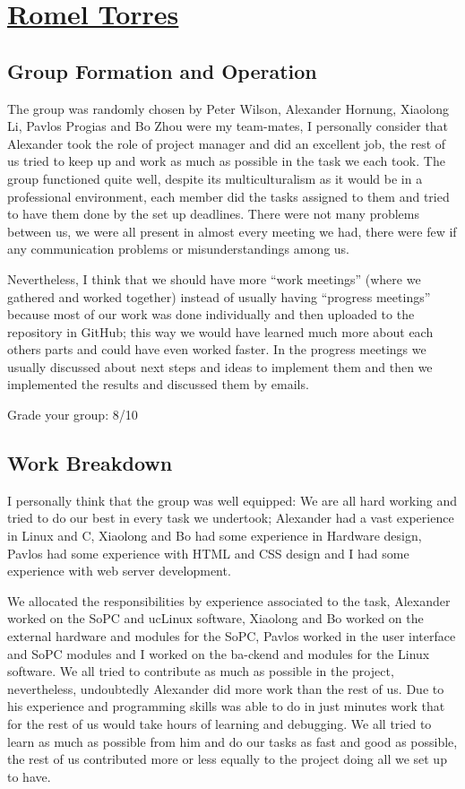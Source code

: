 \section{\texorpdfstring{\href{mailto:rt5g11@ecs.soton.ac.uk}{Romel Torres}} {Romel Torres}}

\subsection{Group Formation and Operation}

The group was randomly chosen by Peter Wilson, Alexander Hornung, Xiaolong Li, Pavlos Progias and Bo Zhou were my team-mates, I personally consider that Alexander
took the role of project manager and did an excellent job, the rest of us tried to keep up and work as much as possible in the task we each took. The group functioned
quite well, despite its multiculturalism as it would be in a professional environment, each member did the tasks assigned to them and tried to have them done by the set
 up deadlines. There were not many problems between us, we were all present in almost every meeting we had, there were few if any communication problems or misunderstandings
among us.

Nevertheless, I think that we should have more “work meetings” (where we gathered and worked together) instead of usually having “progress meetings” because most
 of our work was done individually and then uploaded to the repository in GitHub; this way we would have learned much more about each others parts and could have even
worked faster. In the progress meetings we usually discussed about next steps and ideas to implement them and then we implemented the results and discussed them by emails.

Grade your group: 8/10

\subsection{Work Breakdown}
I personally think that the group was well equipped: We are all hard working and tried to do our best in every task we undertook; Alexander had a vast experience
in Linux and C, Xiaolong and Bo had some experience in Hardware design, Pavlos had some experience with HTML and CSS design and I had some experience with web
server development.

We allocated the responsibilities by experience associated to the task, Alexander worked on the SoPC and ucLinux software, Xiaolong and Bo worked on the external
hardware and modules for the SoPC, Pavlos worked in the user interface and SoPC modules and I worked on the  ba-ckend and modules for the Linux software. We all
tried to contribute as much as possible in the project, nevertheless, undoubtedly Alexander did more work than the rest of us. Due to his experience and programming
skills was able to do in just minutes work that for the rest of us would take hours of learning and debugging. We all tried to learn as much as possible from him
and do our tasks as fast and good as possible, the rest of us contributed more or less equally to the project doing all we set up to have.

